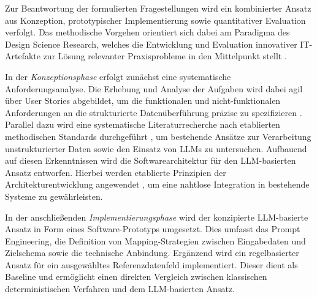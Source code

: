 Zur Beantwortung der formulierten Fragestellungen wird ein kombinierter Ansatz aus Konzeption, prototypischer Implementierung sowie quantitativer Evaluation verfolgt. Das 
methodische Vorgehen orientiert sich dabei am Paradigma des Design Science Research, welches die Entwicklung und Evaluation innovativer IT-Artefakte zur Lösung relevanter
 Praxisprobleme in den Mittelpunkt stellt \parencite[vgl.][S. 77]{hevner2004design}.

In der \textit{Konzeptionsphase} erfolgt zunächst eine systematische Anforderungsanalyse. Die Erhebung und Analyse der Aufgaben wird dabei agil über User Stories abgebildet, um 
die funktionalen und nicht-funktionalen Anforderungen an die strukturierte Datenüberführung präzise zu spezifizieren \parencite[vgl.][S. 17ff.]{cohn2004user}. Parallel dazu wird 
eine systematische Literaturrecherche nach etablierten methodischen Standards durchgeführt \parencite[vgl.][]{webster2002analyzing}, um bestehende Ansätze zur Verarbeitung 
unstrukturierter Daten sowie den Einsatz von LLMs zu untersuchen. Aufbauend auf diesen Erkenntnissen wird die Softwarearchitektur für den LLM-basierten Ansatz entworfen. Hierbei 
werden etablierte Prinzipien der Architekturentwicklung angewendet \parencite[vgl.][]{starke2014effektive}, um eine nahtlose Integration in bestehende Systeme zu gewährleisten.

In der anschließenden \textit{Implementierungsphase} wird der konzipierte LLM-basierte Ansatz in Form eines Software-Prototyps umgesetzt. Dies umfasst das Prompt Engineering, die 
Definition von Mapping-Strategien zwischen Eingabedaten und Zielschema sowie die technische Anbindung. Ergänzend wird ein regelbasierter Ansatz für ein ausgewähltes 
Referenzdatenfeld implementiert. Dieser dient als Baseline und ermöglicht einen direkten Vergleich zwischen klassischen deterministischen Verfahren und dem LLM-basierten Ansatz.